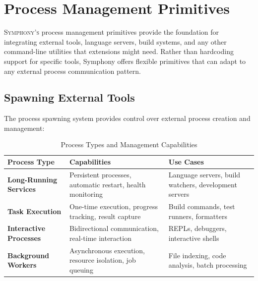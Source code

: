 
\section*{Process Management Primitives}

\lettrine{S}{ymphony's} process management primitives provide the foundation for integrating external tools, language servers, build systems, and any other command-line utilities that extensions might need. Rather than hardcoding support for specific tools, Symphony offers flexible primitives that can adapt to any external process communication pattern.

\subsection*{Spawning External Tools}

The process spawning system provides control over external process creation and management:

\begin{table}[ht]
\centering
\begin{tabular}{@{}p{}p{}p{}@{}}
\toprule
\textbf{Process Type} & \textbf{Capabilities} & \textbf{Use Cases} \\
\midrule
\textbf{Long-Running Services} & 
Persistent processes, automatic restart, health monitoring & 
Language servers, build watchers, development servers \\
\midrule
\textbf{Task Execution} & 
One-time execution, progress tracking, result capture & 
Build commands, test runners, formatters \\
\midrule
\textbf{Interactive Processes} & 
Bidirectional communication, real-time interaction & 
REPLs, debuggers, interactive shells \\
\midrule
\textbf{Background Workers} & 
Asynchronous execution, resource isolation, job queuing & 
File indexing, code analysis, batch processing \\
\bottomrule
\end{tabular}
\caption{Process Types and Management Capabilities}
\end{table}

